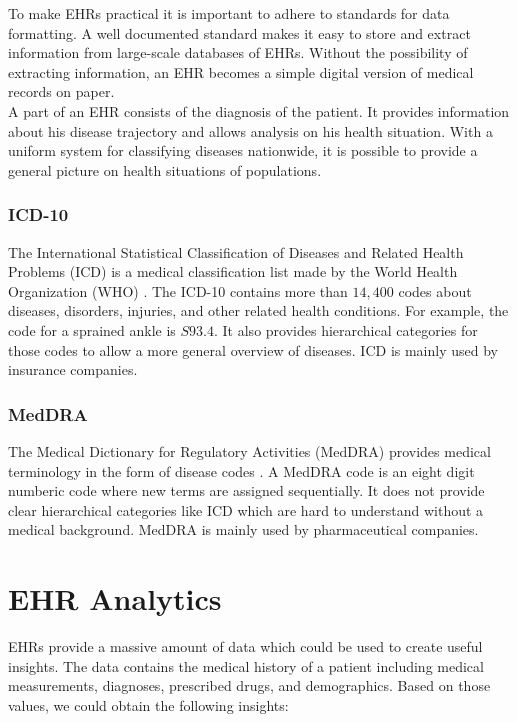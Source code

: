To make EHRs practical it is important to adhere to standards for data formatting. A well documented standard makes it easy to store and extract information from large-scale databases of EHRs. Without the possibility of extracting information, an EHR becomes a simple digital version of medical records on paper. \\
A part of an EHR consists of the diagnosis of the patient. It provides information about his disease trajectory and allows analysis on his health situation. With a uniform system for classifying diseases nationwide, it is possible to provide a general picture on health situations of populations.

\subsubsection{ICD-10}

The International Statistical Classification of Diseases and Related Health Problems (ICD) is a medical classification list made by the World Health Organization (WHO) \cite{WHO_ICD:online}. The ICD-10 contains more than $14,400$ codes about diseases, disorders, injuries, and other related health conditions. For example, the code for a sprained ankle is $S93.4$. It also provides hierarchical categories for those codes to allow a more general overview of diseases. ICD is mainly used by insurance companies.


\subsubsection{MedDRA}

The Medical Dictionary for Regulatory Activities (MedDRA) provides medical terminology in the form of disease codes \cite{MedDRA:online}. A MedDRA code is an eight digit numberic code where new terms are assigned sequentially. It does not provide clear hierarchical categories like ICD which are hard to understand without a medical background. MedDRA is mainly used by pharmaceutical companies.

\section{EHR Analytics}
\label{sec:ehra}

EHRs provide a massive amount of data which could be used to create useful insights. The data contains the medical history of a patient including medical measurements, diagnoses, prescribed drugs, and demographics. Based on those values, we could obtain the following insights:

